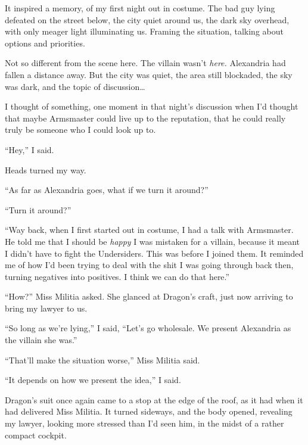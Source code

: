 It inspired a memory, of my first night out in costume.  The bad guy lying defeated on the street below, the city quiet around us, the dark sky overhead, with only meager light illuminating us.  Framing the situation, talking about options and priorities.



Not so different from the scene here.  The villain wasn't \emph{here.  }Alexandria had fallen a distance away.  But the city was quiet, the area still blockaded, the sky was dark, and the topic of discussion\ldots



I thought of something, one moment in that night's discussion when I'd thought that maybe Armsmaster could live up to the reputation, that he could really truly be someone who I could look up to.



``Hey,'' I said.



Heads turned my way.



``As far as Alexandria goes, what if we turn it around?''



``Turn it around?''



``Way back, when I first started out in costume, I had a talk with Armsmaster.  He told me that I should be \emph{happy} I was mistaken for a villain, because it meant I didn't have to fight the Undersiders.  This was before I joined them.  It reminded me of how I'd been trying to deal with the shit I was going through back then, turning negatives into positives.  I think we can do that here.''



``How?'' Miss Militia asked.  She glanced at Dragon's craft, just now arriving to bring my lawyer to us.



``So long as we're lying,'' I said, ``Let's go wholesale.  We present Alexandria as the villain she was.''



``That'll make the situation worse,'' Miss Militia said.



``It depends on how we present the idea,'' I said.



Dragon's suit once again came to a stop at the edge of the roof, as it had when it had delivered Miss Militia.  It turned sideways, and the body opened, revealing my lawyer, looking more stressed than I'd seen him, in the midst of a rather compact cockpit.



